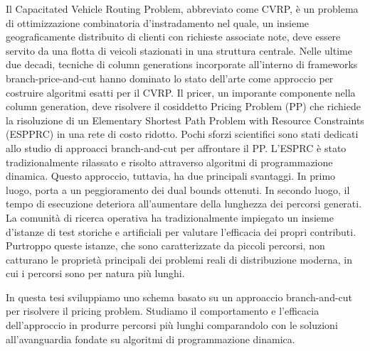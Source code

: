 \noindent Il Capacitated Vehicle Routing Problem, abbreviato come CVRP,
è un problema di ottimizzazione combinatoria d'instradamento nel quale,
un insieme geograficamente distribuito di clienti con richieste associate note,
deve essere servito da una flotta di veicoli stazionati in una struttura centrale.
Nelle ultime due decadi,
tecniche di column generations incorporate all'interno di frameworks branch-price-and-cut
hanno dominato lo stato dell'arte come approccio
per costruire algoritmi esatti per il CVRP.
Il pricer, un imporante componente nella column generation, deve risolvere
il cosiddetto Pricing Problem (PP) che richiede la risoluzione di un
Elementary Shortest Path Problem with Resource Constraints (ESPPRC)
in una rete di costo ridotto.
Pochi sforzi scientifici sono stati dedicati allo studio di approacci
branch-and-cut per affrontare il PP.
L'ESPRC è stato tradizionalmente rilassato e risolto attraverso algoritmi di programmazione dinamica.
Questo approccio, tuttavia, ha due principali svantaggi.
In primo luogo, porta a un peggioramento dei dual bounds ottenuti.
In secondo luogo, il tempo di esecuzione deteriora all'aumentare della lunghezza dei percorsi generati.
La comunità di ricerca operativa ha tradizionalmente impiegato
un insieme d'istanze di test storiche e artificiali per valutare
l'efficacia dei propri contributi.
Purtroppo queste istanze, che sono caratterizzate da piccoli percorsi,
non catturano le proprietà principali dei problemi reali di distribuzione moderna,
in cui i percorsi sono per natura più lunghi.

\noindent In questa tesi sviluppiamo
uno schema basato su un approaccio branch-and-cut per risolvere il pricing problem.
Studiamo il comportamento e l'efficacia dell'approccio in produrre percorsi più lunghi
comparandolo con le soluzioni all'avanguardia fondate su algoritmi di programmazione dinamica.
